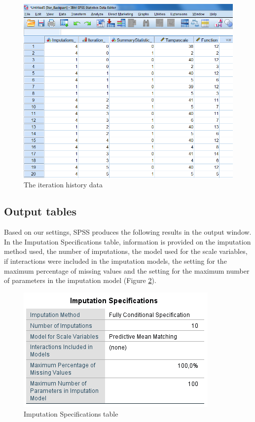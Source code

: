 \documentclass[
]{book}
\begin{document}
\begin{figure}

{\centering \includegraphics[width=0.9\linewidth]{images/fig4.12} 

}

\caption{The iteration history data}\label{fig:fig4-12}
\end{figure}

\hypertarget{output-tables}{%
\subsection{Output tables}\label{output-tables}}

Based on our settings, SPSS produces the following results in the output window. In the Imputation Specifications table, information is provided on the imputation method used, the number of imputations, the model used for the scale variables, if interactions were included in the imputation models, the setting for the maximum percentage of missing values and the setting for the maximum number of parameters in the imputation model (Figure \ref{fig:tab4-4}).

\begin{figure}

{\centering \includegraphics[width=0.9\linewidth]{images/tab4.4} 

}

\caption{Imputation Specifications table}\label{fig:tab4-4}
\end{figure}
\end{document}
